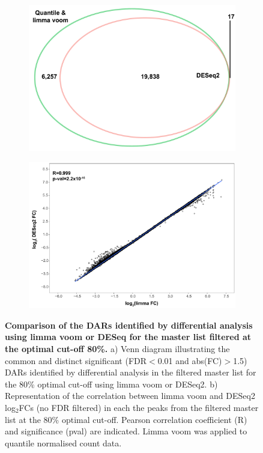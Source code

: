 \begin{figure}[htbp]
\centering
\begin{subfigure}{0.5\textwidth}
\centering
\includegraphics[width=\textwidth]{./Results1/pdfs/ATAC_Core_fresh_CD4vsCD14_venn_diagram_differential_analysis_FDR_01_quantile_DESeq2_only}
\caption{\textbf{}}
\end{subfigure}
\begin{subfigure}{0.5\textwidth}
\centering
\includegraphics[width=\textwidth]{./Results1/pdfs/ATAC_Core_fastq_CD4_CD14_80pcnt_cut_off_correlation_log2FC_quantile_vs_deseq2}
\caption{\textbf{}} %
\end{subfigure}
\caption[Comparison of the DARs identified by differential analysis using limma voom or DESeq for the master list filtered at the optimal cut-off 80\%.]{\textbf{Comparison of the DARs identified by differential analysis using limma voom or DESeq for the master list filtered at the optimal cut-off 80\%.} a) Venn diagram illustrating the common and distinct significant (FDR$<$0.01 and abs(FC)$>$1.5) DARs identified by differential analysis in the filtered master list for the 80\% optimal cut-off using limma voom or DESeq2. b) Representation of the correlation between limma voom and DESeq2 log$_2$FCs (no FDR filtered) in each the peaks from the filtered master list at the 80\% optimal cut-off. Pearson correlation coefficient (R) and significance (pval) are indicated. Limma voom was applied to quantile normalised count data.}

\end{figure}
